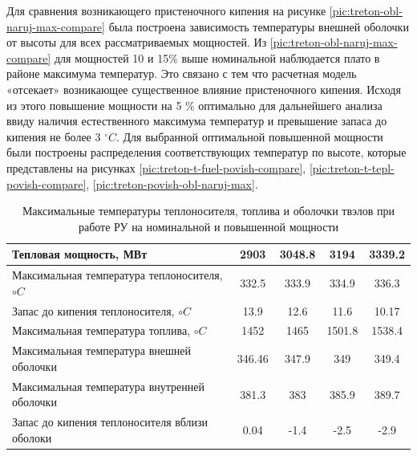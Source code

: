 Для сравнения возникающего пристеночного кипения на рисунке \ref{pic:treton-obl-naruj-max-compare} была построена зависимость температуры внешней оболочки от высоты для всех рассматриваемых мощностей. Из \ref{pic:treton-obl-naruj-max-compare} для мощностей 10 и 15\% выше номинальной наблюдается плато в районе максимума температур. Это связано с тем что расчетная модель «отсекает» возникающее существенное влияние пристеночного кипения. Исходя из этого повышение мощности на 5 \% оптимально для дальнейшего анализа ввиду наличия естественного максимума температур и превышение запаса до кипения не более 3 $^\circ C$. 
Для выбранной оптимальной повышенной мощности были построены распределения соответствующих температур по высоте, которые представлены на рисунках \ref{pic:treton-t-fuel-povish-compare}, \ref{pic:treton-t-tepl-povish-compare}, \ref{pic:treton-povish-obl-naruj-max}. 


\begin{table}[H]
    \caption{Максимальные температуры теплоносителя, топлива и оболочки твэлов при работе РУ на номинальной и повышенной мощности}
    \begin{center}
        \begin{tabular}{|l|c|c|c|c|}
        \toprule
        Тепловая мощность, МВт & 2903 & 3048.8 & 3194 & 3339.2 \\
        \midrule
        \hline
        Максимальная температура теплоносителя, $\circ C$ & 332.5 & 333.9 & 334.9 & 336.3  \\ 
        \hline
        Запас до кипения теплоносителя, $\circ C$ & 13.9 & 12.6 & 11.6 &  10.17 \\
        \hline
        Максимальная температура топлива, $\circ C$ & 1452 & 1465 & 1501.8 & 1538.4  \\
        \hline
        Максимальная температура внешней оболочки & 346.46 & 347.9 & 349  & 349.4 \\
        \hline
        Максимальная температура внутренней оболочки & 381.3 & 383 & 385.9 & 389.7 \\
        \hline
        Запас до кипения теплоносителя вблизи оболоки & 0.04 & -1.4 & -2.5 & -2.9 \\
        \bottomrule
        \end{tabular}
		\label{tabular:t_max_nominal_compare}
    \end{center}
\end{table}

